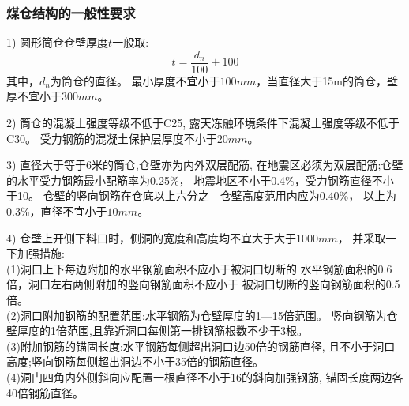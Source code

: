 \subsubsection*{煤仓结构的一般性要求}
1) 圆形筒仓仓壁厚度$t$一般取:
\begin{equation}
t=\frac{d_n}{100}+100
\end{equation}
其中，$d_n$为筒仓的直径。
最小厚度不宜小于$100mm$，当直径大于15m的筒仓，壁厚不宜小于$300mm$。

2) 筒仓的混凝土强度等级不低于C25,
	露天冻融环境条件下混凝土强度等级不低于C30。
	受力钢筋的混凝土保护层厚度不小于$20mm$。

3) 直径大于等于6米的筒仓,仓壁亦为内外双层配筋,
	在地震区必须为双层配筋;仓壁的水平受力钢筋最小配筋率为0.25\%，
	地震地区不小于0.4\%，受力钢筋直径不小于10。
	仓壁的竖向钢筋在仓底以上六分之—仓壁高度范用内应为0.40\%，
	以上为0.3\%，直径不宜小于$10mm$。

4) 仓壁上开侧下料口时，侧洞的宽度和高度均不宜大于大于$1000mm$，
	并采取一下加强措施:\\
    (1)洞口上下每边附加的水平钢筋面积不应小于被洞口切断的
	水平钢筋面积的0.6倍，洞口左右两侧附加的竖向钢筋面积不应小于
	被洞口切断的竖向钢筋面积的0.5倍。\\
    (2)洞口附加钢筋的配置范围:水平钢筋为仓壁厚度的1—15倍范围。
	竖向钢筋为仓壁厚度的1倍范围,且靠近洞口每侧第一排钢筋根数不少于3根。\\
    (3)附加钢筋的锚固长度:水平钢筋每侧超出洞口边50倍的钢筋直径,
	且不小于洞口高度;竖向钢筋每侧超出洞边不小于35倍的钢筋直径。\\
    (4)洞门四角内外侧斜向应配置一根直径不小于16的斜向加强钢筋,
	锚固长度两边各40倍钢筋直径。

